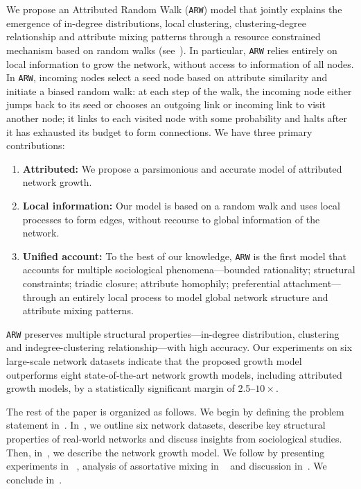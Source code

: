 We propose an Attributed Random Walk (\texttt{ARW}) model that jointly explains
the emergence of in-degree distributions, local clustering, clustering-degree
relationship and attribute mixing patterns through a resource constrained mechanism based on random walks (see~). In particular, \texttt{ARW} relies entirely on local information to grow the network, without access to information of all nodes. In \texttt{ARW}, incoming nodes select a seed node based on attribute similarity and initiate a biased random walk: at each step of the walk, the incoming node either jumps back to its seed or chooses an outgoing link or incoming link to visit another node; it links to each visited node with some probability and halts after it has exhausted its budget to form connections. We have three primary contributions:
\begin{enumerate}
\item \textbf{Attributed:} We propose a parsimonious and accurate model of attributed network growth.
\item \textbf{Local information:} Our model is based on a random walk and uses local processes to form edges, without recourse to global information of the network.
\item \textbf{Unified account:} To the best of our knowledge, \texttt{ARW} is the first model that accounts for multiple sociological phenomena---bounded rationality; structural constraints; triadic closure; attribute homophily; preferential attachment---through an entirely local process to model global network structure and attribute mixing patterns.
\end{enumerate}



\texttt{ARW} preserves multiple structural properties---in-degree distribution, clustering and
indegree-clustering relationship---with high accuracy.
Our experiments on six large-scale network datasets indicate that the proposed growth model outperforms
eight state-of-the-art network growth models, including attributed growth models, by a
statistically significant margin of 2.5--$10\times$.

The rest of the paper is organized as follows.
We begin by defining the problem statement in~.
In~, we outline six network datasets, describe key structural
properties of real-world networks and discuss insights from sociological studies.
Then, in~, we describe the network growth model. We follow
by presenting experiments in ~, analysis of assortative mixing
in ~ and discussion in~.
We conclude in~.